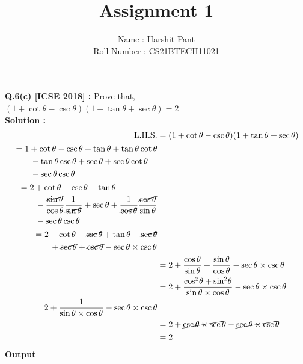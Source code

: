 \documentclass[journal,12pt,twocolumn]{IEEEtran}
\title{Assignment 1}
\author{\Large{Name : Harshit Pant}\\\Large{Roll Number : CS21BTECH11021}}
\date{}
\begin{document}
\maketitle
\setlength{\parindent}{0cm}
\textbf{Q.6(c) [ICSE 2018] :}
Prove that,\\[.1in]
$(1 +\cot\theta -\csc\theta)(1 + \tan\theta +\sec\theta)=2$\\[.1in]
\textbf{Solution : }
\begingroup
\addtolength{\jot}{0.1in}
\begin{align}
\text{L.H.S.}&=(1+ \cot\theta -\csc\theta)(1+\tan\theta+\sec\theta)\\
\begin{split}
&=1+\cot\theta-\csc\theta+\tan\theta+\tan\theta\cot\theta\\
&\qquad-\tan\theta\csc\theta+\sec\theta+\sec\theta\cot\theta\\
&\qquad-\sec\theta\csc\theta\\
\end{split}\\
\begin{split}
&=2+\cot\theta-\csc\theta+\tan\theta\\
&\qquad
-\frac{\cancel{\sin\theta}}{\cos\theta}\frac{1}{\cancel{\sin\theta}}+\sec\theta+\frac{1}{\cancel{\cos\theta}}\frac{\cancel{\cos\theta}}{\sin\theta}\\
&\qquad
-\sec\theta\csc\theta
\end{split}\\
\begin{split}
&=2+\cot\theta-\cancel{\csc\theta}+\tan\theta-\cancel{\sec\theta}\\
&\qquad+\cancel{\sec\theta}+\cancel{\csc\theta}-\sec\theta\times\csc\theta\\
\end{split}\\
&=2+\dfrac{\cos\theta}{\sin\theta}+\dfrac{\sin\theta}{\cos\theta}-\sec\theta\times\csc\theta\\
&=2+\dfrac{{\cos}^2\theta+{\sin}^2\theta}{\sin\theta\times\cos\theta}-\sec\theta\times\csc\theta\\
\begin{split}
&=2+\frac{1}{\sin\theta\times\cos\theta}-\sec\theta\times\csc\theta\\
\end{split}\\
&=2+\cancel{\csc\theta\times\sec\theta}-\cancel{\sec\theta\times\csc\theta}\\
&=2
\end{align}
\endgroup
\textbf{\Large{Output}}\\[.1in]
\end{document}
